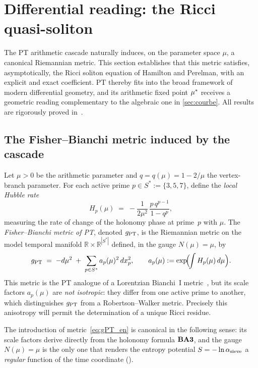 \section{Differential reading: the Ricci quasi-soliton}
\label{sec:soliton}

The PT arithmetic cascade naturally induces, on the parameter space $\mu$, a canonical Riemannian metric. This section establishes that this metric satisfies, asymptotically, the Ricci soliton equation of Hamilton and Perelman, with an explicit and exact coefficient. PT thereby fits into the broad framework of modern differential geometry, and its arithmetic fixed point $\mu^{*}$ receives a geometric reading complementary to the algebraic one in \ref{sec:courbe}. All results are rigorously proved in~\cite{PT_GeoFlow_RicciSoliton}.

\subsection{The Fisher--Bianchi metric induced by the cascade}
\label{sec:soliton:metric}

Let $\mu > 0$ be the arithmetic parameter and $q = q(\mu) = 1 - 2/\mu$ the vertex-branch parameter. For each active prime $p \in S^{*} := \{3, 5, 7\}$, define the \emph{local Hubble rate}
\begin{equation}
H_p(\mu) \;=\; -\dfrac{1}{2\mu^{2}}\,\dfrac{p\,q^{p-1}}{1 - q^{p}},
\label{eq:Hubble_local_en}
\end{equation}
measuring the rate of change of the holonomy phase at prime~$p$ with $\mu$. The \emph{Fisher--Bianchi metric of PT}, denoted $g_{\rm PT}$, is the Riemannian metric on the model temporal manifold $\mathbb R \times \mathbb R^{|S^{*}|}$ defined, in the gauge $N(\mu) = \mu$, by
\begin{equation}
g_{\rm PT} \;=\; -d\mu^{2} \;+\; \sum_{p \in S^{*}} a_p(\mu)^{2}\, dx_p^{2},
\qquad
a_p(\mu) := \exp\!\Bigl(\!\int H_p(\mu)\, d\mu\Bigr).
\label{eq:gPT_en}
\end{equation}
This metric is the PT analogue of a Lorentzian Bianchi~I metric~\cite{ChowKnopf2004}, but its scale factors $a_p(\mu)$ are \emph{not isotropic}: they differ from one active prime to another, which distinguishes $g_{\rm PT}$ from a Robertson--Walker metric. Precisely this anisotropy will permit the determination of a unique Ricci residue.

The introduction of metric~\eqref{eq:gPT_en} is canonical in the following sense: its scale factors derive directly from the holonomy formula $\textbf{BA3}$, and the gauge $N(\mu) = \mu$ is the only one that renders the entropy potential $S = -\ln \alpha_{\rm sieve}$ a \emph{regular} function of the time coordinate (\cite[\S 2]{PT_GeoFlow_RicciSoliton}).

